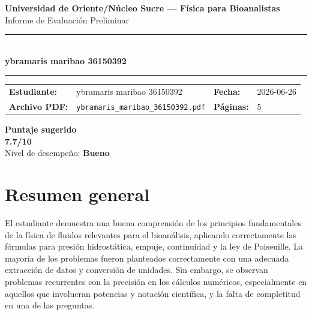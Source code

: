 \documentclass[11pt,a4paper]{article}
\begin{document}
\begin{center}
  {\Large\bfseries\color{azulTitulo} Universidad de Oriente/Núcleo Sucre --- Física para Bioanalistas}\\[4pt]
  {\large Informe de Evaluación Preliminar}\\[12pt]
  \rule{\linewidth}{1.2pt}\\[6pt]
  {\LARGE\bfseries ybramaris maribao 36150392}\\[4pt]
  \rule{\linewidth}{0.6pt}
\end{center}

\vspace{4pt}
\begin{tcolorbox}[cajaTitulo, title=Datos del informe]
\begin{tabular}{@{}llll@{}}
  \textbf{Estudiante:}  & ybramaris maribao 36150392  &
  \textbf{Fecha:}       & 2026-06-26 \\[4pt]
  \textbf{Archivo PDF:} & \texttt{ybramaris\_maribao\_36150392.pdf}  &
  \textbf{Páginas:}     & 5 \\
\end{tabular}
\end{tcolorbox}

\vspace{6pt}
\begin{center}
  \begin{tcolorbox}[
    enhanced,
    colback=white, colframe=desempeno_bueno,
    width=0.62\linewidth,
    boxrule=2pt,
    halign=center, valign=center,
    top=8pt, bottom=8pt,
  ]
    \centering
    {\large\bfseries Puntaje sugerido}\\[6pt]
    {\Huge\bfseries\color{desempeno_bueno} 7.7/10}\\[6pt]
    {\large Nivel de desempeño: \textbf{\color{desempeno_bueno} Bueno}}
  \end{tcolorbox}
\end{center}

\section*{Resumen general}
El estudiante demuestra una buena comprensión de los principios fundamentales de la física de fluidos relevantes para el bioanálisis, aplicando correctamente las fórmulas para presión hidrostática, empuje, continuidad y la ley de Poiseuille. La mayoría de los problemas fueron planteados correctamente con una adecuada extracción de datos y conversión de unidades. Sin embargo, se observan problemas recurrentes con la precisión en los cálculos numéricos, especialmente en aquellos que involucran potencias y notación científica, y la falta de completitud en una de las preguntas.
\end{document}
